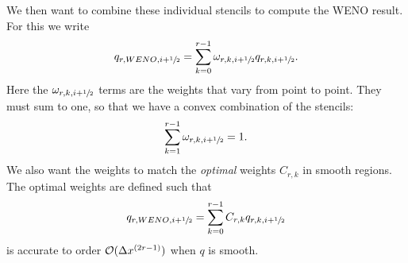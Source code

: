 We then want to combine these individual stencils to compute the WENO result.
For this we write
\begin{equation}
  \label{eq:weno-reconstruction}
  q_{r, WENO, i+{\sfrac{1}{2}}} = \sum_{k=0}^{r-1} \omega_{r, k, i+{\sfrac{1}{2}}} q_{r, k, i+{\sfrac{1}{2}}}.
\end{equation}
Here the $\omega_{r, k, i+{\sfrac{1}{2}}}$ terms are the weights that vary from point
to point. They must sum to one, so that we have a convex combination of the
stencils:
\begin{equation}
  \label{eq:weno-convex}
  \sum_{k=1}^{r-1} \omega_{r, k, i+{\sfrac{1}{2}}} = 1.
\end{equation}
We also want the weights to match the \emph{optimal} weights $C_{r, k}$ in
smooth regions. The optimal weights are defined such that
\begin{equation}
  \label{eq:weno-optimal}
  q_{r, WENO, i+{\sfrac{1}{2}}} = \sum_{k=0}^{r-1} C_{r, k} q_{r, k, i+{\sfrac{1}{2}}}
\end{equation}
is accurate to order ${\cal O}(\Delta x^{(2 r - 1)})$ when $q$ is smooth.

